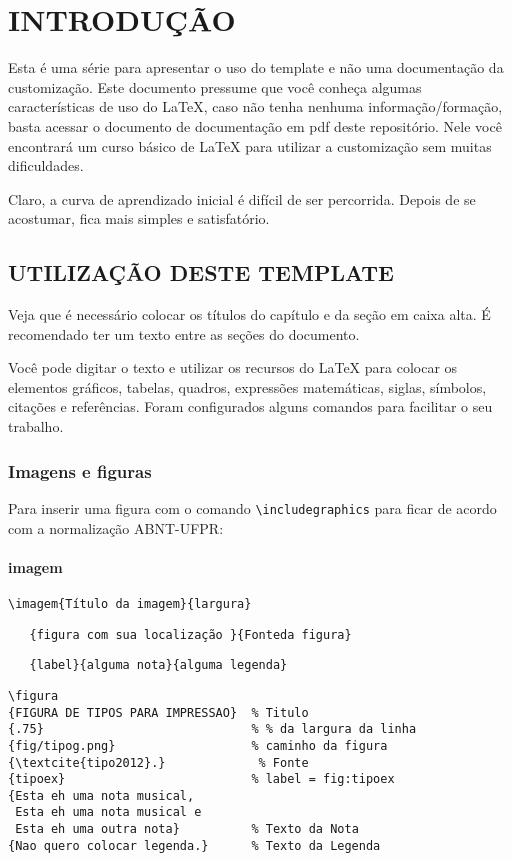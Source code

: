 \chapter{INTRODUÇÃO} \label{cha:introd}

Esta é uma série para apresentar o uso do template e não uma documentação da customização. Este documento pressume que você conheça algumas características de uso do LaTeX, caso não tenha nenhuma informação/formação, basta acessar o documento de documentação em pdf deste repositório. Nele você encontrará um curso básico de LaTeX para utilizar a customização sem muitas dificuldades.

Claro, a curva de aprendizado inicial é difícil de ser percorrida. Depois de se acostumar, fica mais simples e satisfatório.
\section{UTILIZAÇÃO DESTE TEMPLATE} \label{sec:util}

Veja que é necessário colocar os títulos do capítulo e da seção em caixa alta. É recomendado ter um texto entre as seções do documento.

Você pode digitar o texto e utilizar os recursos do LaTeX para colocar os elementos gráficos, tabelas, quadros, expressões matemáticas, siglas, símbolos, citações e referências. Foram configurados alguns comandos para facilitar o seu trabalho.
\subsection[Imagens]{Imagens e figuras}\label{ssec:imafig}

Para inserir uma figura com o comando \verb+\includegraphics+ para ficar de acordo com a normalização ABNT-UFPR:
\subsubsection{imagem}\label{sssec:imagem}

\verb+\imagem{Título da imagem}{largura}+ 

\verb+   {figura com sua localização }{Fonteda figura}+

\verb+   {label}{alguma nota}{alguma legenda}+

\begin{lstlisting}
\figura
{FIGURA DE TIPOS PARA IMPRESSAO}  % Titulo
{.75}                             % % da largura da linha
{fig/tipog.png}                   % caminho da figura
{\textcite{tipo2012}.}             % Fonte
{tipoex}                          % label = fig:tipoex
{Esta eh uma nota musical, 
 Esta eh uma nota musical e 
 Esta eh uma outra nota}          % Texto da Nota
{Nao quero colocar legenda.}      % Texto da Legenda
\end{lstlisting}

